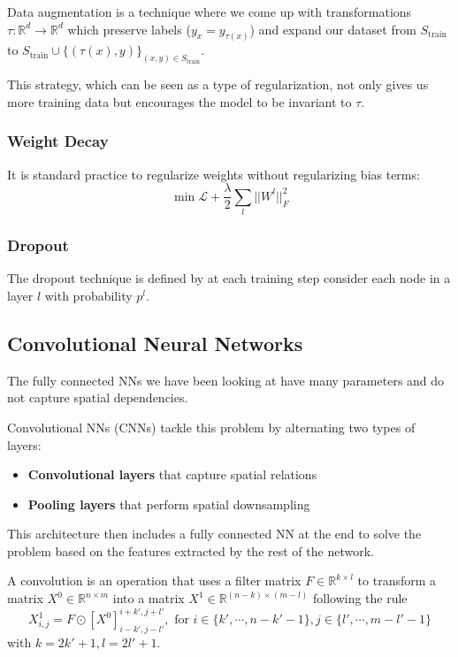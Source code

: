 \documentclass{article}
\newcommand{\R}{\mathbb{R}}
\newcommand{\loss}{\mathcal{L}}
\begin{document}
Data augmentation is a technique where we come up with transformations $\tau : \R^d \to \R^d$ which preserve labels ($y_x = y_{\tau(x)}$) and expand our dataset from $S_\text{train}$ to $S_\text{train} \cup \{ (\tau(x), y) \}_{(x,y) \in S_\text{train}}$.

This strategy, which can be seen as a type of regularization, not only gives us more training data but encourages the model to be invariant to $\tau$.

\subsubsection{Weight Decay}

It is standard practice to regularize weights without regularizing bias terms:
$$
\min \loss + \frac{\lambda}{2} \sum_l ||W^l||^2_F
$$

\subsubsection{Dropout}

The dropout technique is defined by at each training step consider each node in a layer $l$ with probability $p^l$.

\subsection{Convolutional Neural Networks}

The fully connected NNs we have been looking at have many parameters and do not capture spatial dependencies.

Convolutional NNs (CNNs) tackle this problem by alternating two types of layers:
\begin{itemize}
    \item \textbf{Convolutional layers} that capture spatial relations
    \item \textbf{Pooling layers} that perform spatial downsampling
\end{itemize}

This architecture then includes a fully connected NN at the end to solve the problem based on the features extracted by the rest of the network.

A convolution is an operation that uses a filter matrix $F \in \R^{k \times l}$ to transform a matrix $X^0 \in \R^{n \times m}$ into a matrix $X^1 \in \R^{(n-k) \times (m-l)}$ following the rule
$$
X_{i,j}^1 = F \odot [X^0]_{i-k',j-l'}^{i+k',j+l'}, \text{ for } i \in \{k', \cdots, n-k'-1\}, j \in \{l', \cdots, m-l'-1\}
$$
with $k = 2k'+1, l=2l'+1$.
\end{document}
